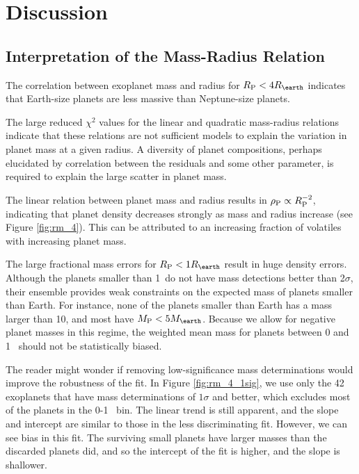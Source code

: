 \documentclass[11pt]{aastex}
\begin{document}
\section{Discussion}
	
\subsection{Interpretation of the Mass-Radius Relation}
The correlation between exoplanet mass and radius for $\rpl < 4 \rearth$ indicates that Earth-size planets are less massive than Neptune-size planets.

The large reduced $\chi^2$ values for the linear and quadratic mass-radius relations indicate that these relations are not sufficient models to explain the variation in planet mass at a given radius.  A diversity of planet compositions, perhaps elucidated by correlation between the residuals and some other parameter, is required to explain the large scatter in planet mass.

The linear relation between planet mass and radius results in $\rho_{\rm P} \propto R_{\rm P}^{-2}$, indicating that planet density decreases strongly as mass and radius increase (see Figure \ref{fig:rm_4}).  This can be attributed to an increasing fraction of volatiles with increasing planet mass.

The large fractional mass errors for $\rpl < 1 \rearth$ result in huge density errors.  Although the planets smaller than 1\rearth\ do not have mass detections better than 2$\sigma$, their ensemble provides weak constraints on the expected mass of planets smaller than Earth.  For instance, none of the planets smaller than Earth has a mass larger than 10\mearth, and most have $\mpl < 5\mearth$.  Because we allow for negative planet masses in this regime, the weighted mean mass for planets between 0 and 1 \rearth\ should not be statistically biased.

The reader might wonder if removing low-significance mass determinations would improve the robustness of the fit.  In Figure \ref{fig:rm_4_1sig}, we use only the 42 exoplanets that have mass determinations of $1\sigma$ and better, which excludes most of the planets in the 0-1 \rearth\ bin.  The linear trend is still apparent, and the slope and intercept are similar to those in the less discriminating fit.  However, we can see bias in this fit.  The surviving small planets have larger masses than the discarded planets did, and so the intercept of the fit is higher, and the slope is shallower.
\end{document}
